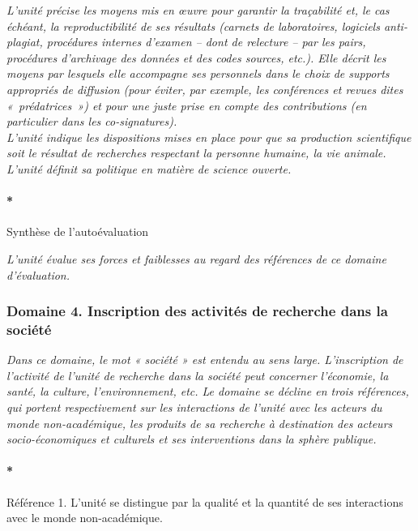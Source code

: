 \documentclass[]{article}
\let\oldparagraph\paragraph
\renewcommand{\paragraph}[1]{\oldparagraph{#1}\mbox{}}
\newcommand{\instructions}[1]{{\em \color{hceresgreen}#1}}
\begin{document}
\instructions{L’unité précise les moyens mis en œuvre pour garantir la traçabilité et, le cas échéant, la reproductibilité de ses résultats (carnets de laboratoires, logiciels anti-plagiat, procédures internes d’examen – dont de relecture – par les pairs, procédures d’archivage des données et des codes sources, etc.). Elle décrit les moyens par lesquels elle accompagne ses personnels dans le choix de supports appropriés de diffusion (pour éviter, par exemple, les conférences et revues dites « prédatrices ») et pour une juste prise en compte des contributions (en particulier dans les co-signatures).\\

L’unité indique les dispositions mises en place pour que sa production scientifique soit le résultat de recherches respectant la personne humaine, la vie animale. 
L’unité définit sa politique en matière de science ouverte.}

\paragraph*{Synthèse de l'autoévaluation}

\instructions{L’unité évalue ses forces et faiblesses au regard des références de ce domaine d’évaluation.}

\subsubsection*{Domaine 4. Inscription des activités de recherche dans
la société}

\instructions{Dans ce domaine, le mot « société » est entendu au sens large. L'inscription de l’activité de l’unité de recherche dans la société peut concerner l’économie, la santé, la culture, l’environnement, etc. Le domaine se décline en trois références, qui portent respectivement sur les interactions de l’unité avec les acteurs du monde non-académique, les produits de sa recherche à destination des acteurs socio-économiques et culturels et ses interventions dans la sphère publique.}

\paragraph*{Référence 1. L'unité se distingue par la qualité et la
quantité de ses interactions avec le monde non-académique.}
\end{document}
